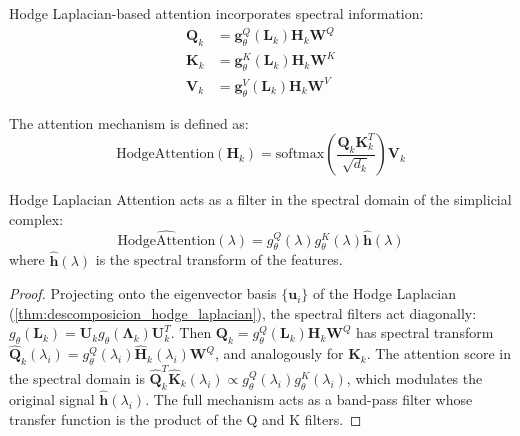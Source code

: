 \begin{definition}\label{def:hodge_laplacian_attention}
Hodge Laplacian-based attention incorporates spectral information:
\begin{align}
    \mathbf{Q}_k &= \mathbf{g}_{\theta}^Q(\mathbf{L}_k) \mathbf{H}_k \mathbf{W}^Q \\
    \mathbf{K}_k &= \mathbf{g}_{\theta}^K(\mathbf{L}_k) \mathbf{H}_k \mathbf{W}^K \\
    \mathbf{V}_k &= \mathbf{g}_{\theta}^V(\mathbf{L}_k) \mathbf{H}_k \mathbf{W}^V
\end{align}

The attention mechanism is defined as:
\begin{equation}
    \text{HodgeAttention}(\mathbf{H}_k) = \text{softmax}\left(\frac{\mathbf{Q}_k \mathbf{K}_k^T}{\sqrt{d_k}}\right) \mathbf{V}_k
\end{equation}
\end{definition}

\begin{theorem}\label{thm:interpretacion_frecuencial_hodge}
Hodge Laplacian Attention acts as a filter in the spectral domain of the simplicial complex:
\begin{equation}
    \widehat{\text{HodgeAttention}}(\lambda) = g_{\theta}^Q(\lambda) g_{\theta}^K(\lambda) \hat{\mathbf{h}}(\lambda)
\end{equation}
where $\hat{\mathbf{h}}(\lambda)$ is the spectral transform of the features.
\end{theorem}

\begin{proof}
Projecting onto the eigenvector basis $\{\mathbf{u}_i\}$ of the Hodge Laplacian (\autoref{thm:descomposicion_hodge_laplacian}), the spectral filters act diagonally: $g_\theta(\mathbf{L}_k) = \mathbf{U}_k g_\theta(\boldsymbol{\Lambda}_k) \mathbf{U}_k^T$. Then $\mathbf{Q}_k = g_\theta^Q(\mathbf{L}_k) \mathbf{H}_k \mathbf{W}^Q$ has spectral transform $\hat{\mathbf{Q}}_k(\lambda_i) = g_\theta^Q(\lambda_i) \hat{\mathbf{H}}_k(\lambda_i) \mathbf{W}^Q$, and analogously for $\mathbf{K}_k$. The attention score in the spectral domain is $\hat{\mathbf{Q}}_k^T \hat{\mathbf{K}}_k(\lambda_i) \propto g_\theta^Q(\lambda_i) g_\theta^K(\lambda_i)$, which modulates the original signal $\hat{\mathbf{h}}(\lambda_i)$. The full mechanism acts as a band-pass filter whose transfer function is the product of the Q and K filters.
\end{proof}

